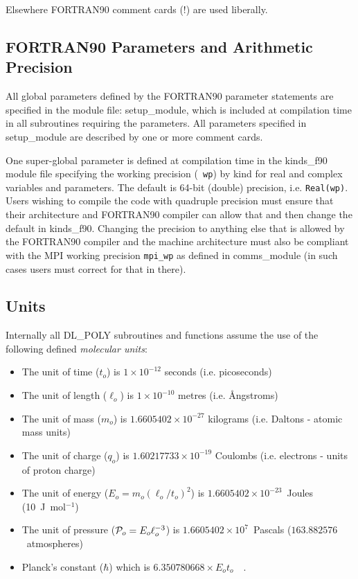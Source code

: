 \noindent Elsewhere FORTRAN90 comment cards (!)
are used liberally.

\subsection{FORTRAN90 Parameters and Arithmetic Precision}
\label{precision}

All global parameters defined by the FORTRAN90
parameter statements are specified in the
module file: {\sc setup\_module}, which is included at compilation
time in all subroutines requiring the parameters.  All parameters
specified in {\sc setup\_module} are described by one or more
comment cards.

One super-global parameter is defined at compilation time in the
{\sc kinds\_f90} module file specifying the working precision ({\tt
wp}) by kind for real and complex variables and parameters.  The
default is 64-bit (double) precision, i.e. {\tt Real(wp)}.  Users
wishing to compile the code with quadruple precision must ensure
that their architecture and FORTRAN90 compiler can allow that and
then change the default in {\sc kinds\_f90}.  Changing the precision
to anything else that is allowed by the FORTRAN90 compiler and the
machine architecture must also be compliant with the MPI working
precision {\tt mpi\_wp} as defined in {\sc comms\_module} (in such
cases users must correct for that in there).

\subsection{Units}\label{units}

Internally all DL\_POLY subroutines and functions assume the use of the
following defined {\em molecular units}:
\begin{itemize}
\item The unit of time ($t_{o}$) is $1 \times 10^{-12}$ seconds (i.e. picoseconds)
\item The unit of length ($\ell_{o}$) is $1 \times 10^{-10}$ metres (i.e. \AA ngstroms)
\item The unit of mass ($m_{o}$) is $1.6605402 \times 10^{-27}$ kilograms (i.e. Daltons - atomic mass units)
\item The unit of charge ($q_{o}$) is $1.60217733 \times 10^{-19}$ Coulombs (i.e. electrons - units of proton charge)
\item The unit of energy ($E_{o}=m_{o}(\ell_{o}/t_{o})^{2}$) is $1.6605402 \times 10^{-23}$~Joules (10~J~mol$^{-1}$)
\item The unit of pressure (${\cal P}_{o}=E_{o}\ell_{o}^{-3}$) is $1.6605402 \times 10^{7}$~Pascals ($163.882576$~atmospheres)
\item Planck's constant ($\hbar$) which is $6.350780668 \times E_{o} t_{o}$~~.
\end{itemize}

